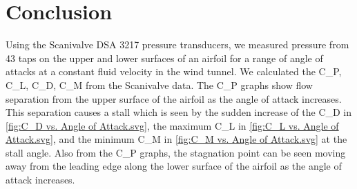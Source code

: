 \chapter{Conclusion}
\label{cp:conclusion}
Using the Scanivalve DSA 3217 pressure transducers, we measured pressure from \num{43} taps on the upper and lower surfaces of an airfoil for a range of angle of attacks at a constant fluid velocity in the wind tunnel. We calculated the \gls{C_P}, \gls{C_L}, \gls{C_D}, \gls{C_M} from the Scanivalve data. The \gls{C_P} graphs show flow separation from the upper surface of the airfoil as the angle of attack increases. This separation causes a stall which is seen by the sudden increase of the \gls{C_D} in \autoref{fig:C_D vs. Angle of Attack.svg}, the maximum \gls{C_L} in \autoref{fig:C_L vs. Angle of Attack.svg}, and the minimum \gls{C_M} in \autoref{fig:C_M vs. Angle of Attack.svg} at the stall angle. Also from the \gls{C_P} graphs, the stagnation point can be seen moving away from the leading edge along the lower surface of the airfoil as the angle of attack increases.
